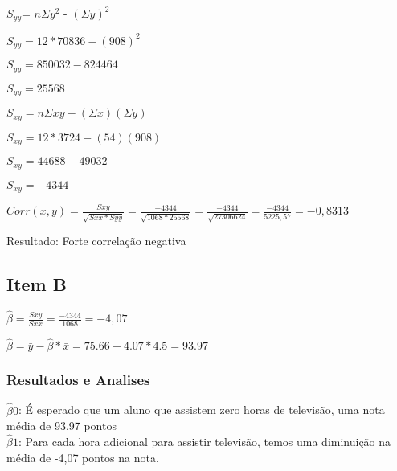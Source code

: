 \documentclass{article}
\begin{document}
            \begin{flushleft}
                $S_{yy}$= $n\Sigma y^2$ - $(\Sigma y)^2$

                $S_{yy} = 12* 70836 - (908)^2$

                $S_{yy} = 850032 - 824464 $

                $S_{yy} = 25568$

            \end{flushleft}

            \begin{flushleft}

            $S_{xy} = n\Sigma xy-(\Sigma x)(\Sigma y)$

            $S_{xy} = 12*3724-(54)(908)$

            $S_{xy} = 44688-49032$ 

            $S_{xy} = -4344$ 

            \end{flushleft}

            \begin{flushleft}
                $Corr(x,y) = \frac{Sxy}{\sqrt{Sxx * Syy}} = \frac{-4344}{\sqrt{1068 * 25568}} =
                            \frac{-4344}{\sqrt{27306624}} = \frac{-4344}{5225,57} = -0,8313 $

            \end{flushleft}

            Resultado: Forte correlação negativa

    \subsection{Item B}

            \begin{flushleft}

                $\hat{\beta} = \frac{Sxy}{Sxx} = \frac{-4344}{1068} = -4,07$

                $\hat{\beta} = \bar{y} - \hat{\beta} * \bar{x} = 75.66+4.07* 4.5 = 93.97$
            \end{flushleft}

            \subsubsection{Resultados e Analises}

            $\hat{\beta}0 $: É esperado que um aluno
            que assistem zero horas de televisão, uma nota média de 93,97 pontos  \\    
            $\hat{\beta}1 $: Para cada hora adicional para assistir televisão,
                    temos uma diminuição na média de -4,07 pontos na nota. 
\end{document}
